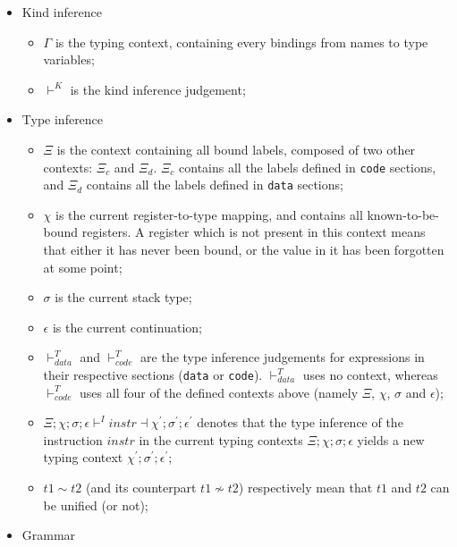 \begin{itemize}
  \item Kind inference
        \begin{itemize}
          \item $\Gamma$ is the typing context, containing every bindings from names to type variables;
          \item $\vdash^{K}$ is the kind inference judgement;
        \end{itemize}
  \item Type inference
        \begin{itemize}
          \item $\Xi$ is the context containing all bound labels, composed of two other contexts: $\Xi_{c}$ and $\Xi_{d}$. $\Xi_{c}$ contains all the labels defined in \texttt{code} sections, and $\Xi_{d}$ contains all the labels defined in \texttt{data} sections;
          \item $\chi$ is the current register-to-type mapping, and contains all known-to-be-bound registers.
                A register which is not present in this context means that either it has never been bound, or the value in it has been forgotten at some point;
          \item $\sigma$ is the current stack type;
          \item $\epsilon$ is the current continuation;
          \item $\vdash^{T}_{data}$ and $\vdash^{T}_{code}$ are the type inference judgements for expressions in their respective sections (\texttt{data} or \texttt{code}).
                $\vdash^{T}_{data}$ uses no context, whereas $\vdash^{T}_{code}$ uses all four of the defined contexts above (namely $\Xi$, $\chi$, $\sigma$ and $\epsilon$);
          \item $\Xi;\chi;\sigma;\epsilon\vdash^{I}instr\dashv\chi^\prime;\sigma^\prime;\epsilon^\prime$ denotes that the type inference of the instruction $instr$ in the current typing contexts $\Xi;\chi;\sigma;\epsilon$ yields a new typing context $\chi^\prime;\sigma^\prime;\epsilon^\prime$;
          \item $t1 \sim t2$ (and its counterpart $t1 \nsim t2$) respectively mean that $t1$ and $t2$ can be unified (or not);
        \end{itemize}
  \item Grammar
        \begin{figure}[H]
          \centering
        \end{figure}

\end{itemize}
